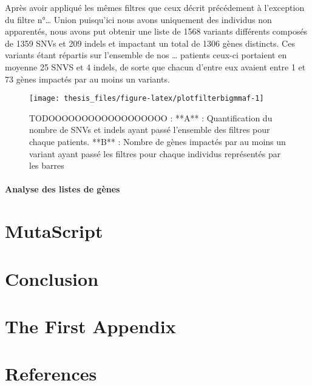 \documentclass[12pt,twoside]{reedthesis}
\theoremstyle{definition}
\theoremstyle{definition}
\theoremstyle{remark}
\begin{document}
  \newpage
  
  Après avoir appliqué les mêmes filtres que ceux décrit précédement à
  l'exception du filtre n°\ldots{} Union puisqu'ici nous avons uniquement
  des individus non apparentés, nous avons put obtenir une liste de 1568
  variants différents composés de 1359 SNVs et 209 indels et impactant un
  total de 1306 gènes distincts. Ces variants étant répartis sur
  l'ensemble de nos \ldots{} patients ceux-ci portaient en moyenne 25 SNVS
  et 4 indels, de sorte que chacun d'entre eux avaient entre 1 et 73 gènes
  impactés par au moins un variants.
  
  \begin{figure}
  
  {\centering \texttt{[image: thesis\_files/figure-latex/plotfilterbigmmaf-1]} 
  
  }
  
  \caption[TODOOOOOOOOOOOOOOOOOO]{TODOOOOOOOOOOOOOOOOOO : **A** : Quantification du nombre de SNVs et indels ayant passé l'ensemble des filtres pour chaque patients. **B** : Nombre de gènes impactés par au moins un variant ayant passé les filtres pour chaque individus représentés par les barres }\label{fig:plotfilterbigmmaf}
  \end{figure}
  
  \subsubsection{Analyse des listes de
  gènes}\label{analyse-des-listes-de-genes}
  
  \chapter{MutaScript}\label{mutascript}
  
  \chapter*{Conclusion}\label{conclusion}
  
  \chapter{The First Appendix}\label{the-first-appendix}
  
  \chapter*{References}\label{references}
  
\end{document}
